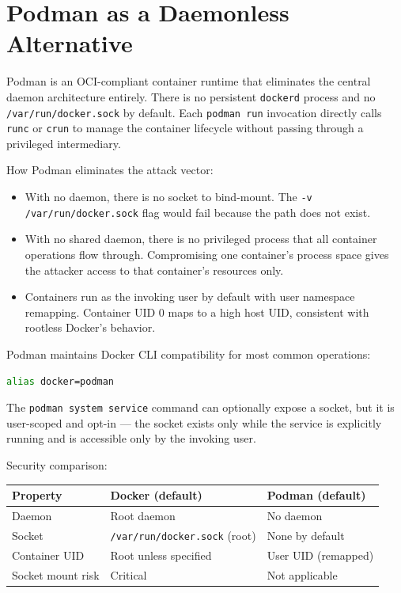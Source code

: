 
\section{Podman as a Daemonless Alternative}

Podman is an OCI-compliant container runtime that eliminates the central daemon architecture entirely. There is no persistent \texttt{dockerd} process and no \texttt{/var/run/docker.sock} by default. Each \texttt{podman run} invocation directly calls \texttt{runc} or \texttt{crun} to manage the container lifecycle without passing through a privileged intermediary.

How Podman eliminates the attack vector:

\begin{itemize}
    \item With no daemon, there is no socket to bind-mount. The \texttt{-v /var/run/docker.sock} flag would fail because the path does not exist.
    \item With no shared daemon, there is no privileged process that all container operations flow through. Compromising one container's process space gives the attacker access to that container's resources only.
    \item Containers run as the invoking user by default with user namespace remapping. Container UID 0 maps to a high host UID, consistent with rootless Docker's behavior.
\end{itemize}

Podman maintains Docker CLI compatibility for most common operations:

\begin{lstlisting}[language=bash]
alias docker=podman
\end{lstlisting}

The \texttt{podman system service} command can optionally expose a socket, but it is user-scoped and opt-in --- the socket exists only while the service is explicitly running and is accessible only by the invoking user.

Security comparison:

\begin{center}
\begin{tabular}{lll}
\hline
\textbf{Property} & \textbf{Docker (default)} & \textbf{Podman (default)} \\
\hline
Daemon & Root daemon & No daemon \\
Socket & \texttt{/var/run/docker.sock} (root) & None by default \\
Container UID & Root unless specified & User UID (remapped) \\
Socket mount risk & Critical & Not applicable \\
\hline
\end{tabular}
\end{center}

